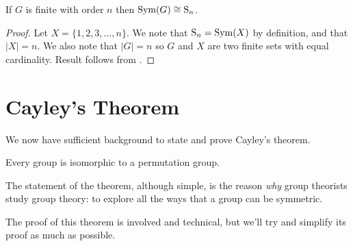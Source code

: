 \begin{corollary}\label{corollary-symmetric-group-of-finite-order}
    If $G$ is finite with order $n$ then $\mathrm{Sym}(G) \cong \mathrm{S}_{n}$.
\end{corollary}
\begin{proof}
    Let $X = \{1, 2, 3, \dots, n\}$. We note that $\mathrm{S}_{n} = \mathrm{Sym}(X)$ by definition, and that $|X| = n$. We also note that $|G| = n$ so $G$ and $X$ are two finite sets with equal cardinality. Result follows from .
\end{proof}

\section{Cayley's Theorem}
We now have sufficient background to state and prove Cayley's theorem.

\begin{theorem}[Cayley]\label{thrm-cayley}
    Every group is isomorphic to a permutation group.
\end{theorem}

The statement of the theorem, although simple, is the reason \textit{why} group theorists study group theory: to explore all the ways that a group can be symmetric.

The proof of this theorem is involved and technical, but we'll try and simplify its proof as much as possible.

